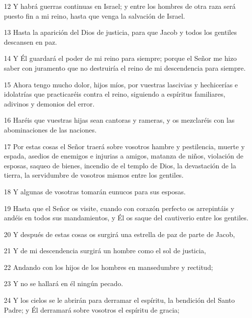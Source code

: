 \par 12 Y habrá guerras continuas en Israel; y entre los hombres de otra raza será puesto fin a mi reino, hasta que venga la salvación de Israel.

\par 13 Hasta la aparición del Dios de justicia, para que Jacob y todos los gentiles descansen en paz.

\par 14 Y Él guardará el poder de mi reino para siempre; porque el Señor me hizo saber con juramento que no destruiría el reino de mi descendencia para siempre.

\par 15 Ahora tengo mucho dolor, hijos míos, por vuestras lascivias y hechicerías e idolatrías que practicaréis contra el reino, siguiendo a espíritus familiares, adivinos y demonios del error.

\par 16 Haréis que vuestras hijas sean cantoras y rameras, y os mezclaréis con las abominaciones de las naciones.

\par 17 Por estas cosas el Señor traerá sobre vosotros hambre y pestilencia, muerte y espada, asedios de enemigos e injurias a amigos, matanza de niños, violación de esposas, saqueo de bienes, incendio de el templo de Dios, la devastación de la tierra, la servidumbre de vosotros mismos entre los gentiles.

\par 18 Y algunas de vosotras tomarán eunucos para sus esposas.

\par 19 Hasta que el Señor os visite, cuando con corazón perfecto os arrepintáis y andéis en todos sus mandamientos, y Él os saque del cautiverio entre los gentiles.

\par 20 Y después de estas cosas os surgirá una estrella de paz de parte de Jacob,

\par 21 Y de mi descendencia surgirá un hombre como el sol de justicia,

\par 22 Andando con los hijos de los hombres en mansedumbre y rectitud;

\par 23 Y no se hallará en él ningún pecado.

\par 24 Y los cielos se le abrirán para derramar el espíritu, la bendición del Santo Padre; y Él derramará sobre vosotros el espíritu de gracia;

